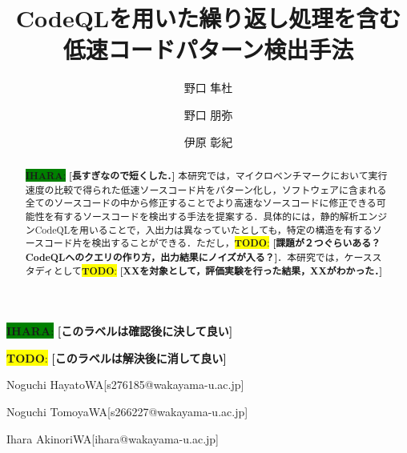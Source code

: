 \documentclass[submit,techrep,noauthor]{ipsj}
\newcommand{\todo}[1]{\colorbox{yellow}{{\bf TODO}:}{\color{red} {\textbf{[#1]}}}}
\newcommand{\ihara}[1]{\colorbox{green}{{\bf IHARA}:}{\color{blue} {\textbf{[#1]}}}}
\begin{document}
\title{CodeQLを用いた繰り返し処理を含む
\\
低速コードパターン検出手法
}

\noindent\ihara{このラベルは確認後に決して良い}

\noindent\todo{このラベルは解決後に消して良い}


\author{野口 隼杜}{Noguchi Hayato}{WA}[s276185@wakayama-u.ac.jp]
\author{野口 朋弥}{Noguchi Tomoya}{WA}[s266227@wakayama-u.ac.jp]
\author{伊原 彰紀}{Ihara Akinori}{WA}[ihara@wakayama-u.ac.jp]

\begin{abstract}
\ihara{長すぎなので短くした．}
本研究では，マイクロベンチマークにおいて実行速度の比較で得られた低速ソースコード片をパターン化し，ソフトウェアに含まれる全てのソースコードの中から修正することでより高速なソースコードに修正できる可能性を有するソースコードを検出する手法を提案する．具体的には，静的解析エンジンCodeQLを用いることで，入出力は異なっていたとしても，特定の構造を有するソースコード片を検出することができる．ただし，\todo{課題が２つぐらいある？CodeQLへのクエリの作り方，出力結果にノイズが入る？}．本研究では，ケーススタディとして\todo{XXを対象として，評価実験を行った結果，XXがわかった．}
\end{abstract}
\end{document}
